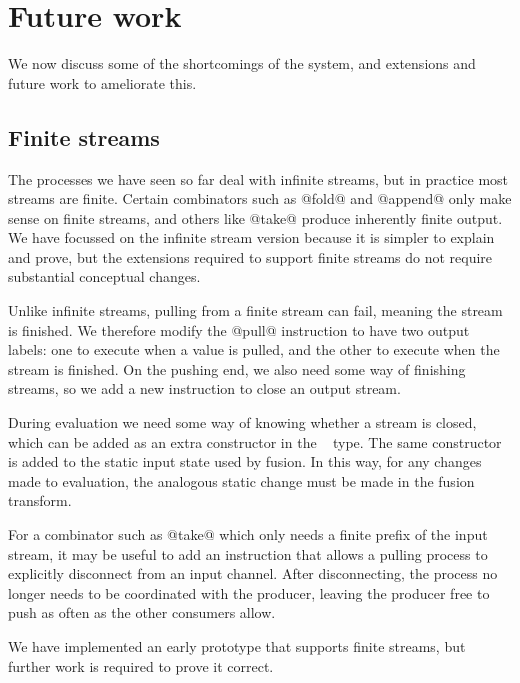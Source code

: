 
\section{Future work}
\label{s:FutureWork}

We now discuss some of the shortcomings of the system, and extensions and future work to ameliorate this.

\subsection{Finite streams}
\label{s:Finite}

The processes we have seen so far deal with infinite streams, but in practice most streams are finite.
Certain combinators such as @fold@ and @append@ only make sense on finite streams, and others like @take@ produce inherently finite output.
We have focussed on the infinite stream version because it is simpler to explain and prove, but the extensions required to support finite streams do not require substantial conceptual changes.

Unlike infinite streams, pulling from a finite stream can fail, meaning the stream is finished. We therefore modify the @pull@ instruction to have two output labels: one to execute when a value is pulled, and the other to execute when the stream is finished. On the pushing end, we also need some way of finishing streams, so we add a new instruction to close an output stream.

During evaluation we need some way of knowing whether a stream is closed, which can be added as an extra constructor in the \InputState~ type. The same constructor is added to the static input state used by fusion. In this way, for any changes made to evaluation, the analogous static change must be made in the fusion transform.

For a combinator such as @take@ which only needs a finite prefix of the input stream, it may be useful to add an instruction that allows a pulling process to explicitly disconnect from an input channel.
After disconnecting, the process no longer needs to be coordinated with the producer, leaving the producer free to push as often as the other consumers allow.

We have implemented an early prototype that supports finite streams, but further work is required to prove it correct.

